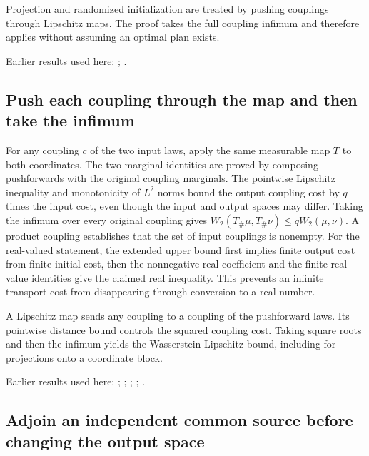 \documentclass[11pt,a4paper]{report}
\begin{document}
Projection and randomized initialization are treated by pushing couplings through Lipschitz maps. The proof takes the full coupling infimum and therefore applies without assuming an optimal plan exists.



Earlier results used here: \cite[Section~3.18]{LangevinLean2026ULASC}; \cite[Section~3.22]{LangevinLean2026ULASC}.
\subsection{\texorpdfstring{Push each coupling through the map and then take the infimum}{Push each coupling through the map and then take the infimum}}
\label{report-step-KineticLangevin-TransportMap-lean-1}


For any coupling \(c\) of the two input laws, apply the same measurable map \(T\) to both coordinates. The two marginal identities are proved by composing pushforwards with the original coupling marginals. The pointwise Lipschitz inequality and monotonicity of \(L^{2}\) norms bound the output coupling cost by \(q\) times the input cost, even though the input and output spaces may differ. Taking the infimum over every original coupling gives \(W_2(T_\#\mu,T_\#\nu)\le qW_2(\mu,\nu)\). A product coupling establishes that the set of input couplings is nonempty. For the real-valued statement, the extended upper bound first implies finite output cost from finite initial cost, then the nonnegative-real coefficient and the finite real value identities give the claimed real inequality. This prevents an infinite transport cost from disappearing through conversion to a real number.



A Lipschitz map sends any coupling to a coupling of the pushforward laws. Its pointwise distance bound controls the squared coupling cost. Taking square roots and then the infimum yields the Wasserstein Lipschitz bound, including for projections onto a coordinate block.



Earlier results used here: \cite[Section~3.17.1]{LangevinLean2026ULASC}; \cite[Section~3.17.2]{LangevinLean2026ULASC}; \cite[Section~3.17.3]{LangevinLean2026ULASC}; \cite[Section~3.17.4]{LangevinLean2026ULASC}; \cite[Section~3.17.9]{LangevinLean2026ULASC}.
\subsection{\texorpdfstring{Adjoin an independent common source before changing the output space}{Adjoin an independent common source before changing the output space}}
\label{report-step-KineticLangevin-TransportMap-lean-2}
\end{document}
